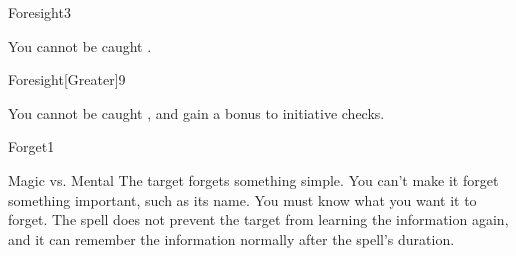 \begin{spellsection}{Foresight}{3}
    \begin{spellheader}
    \end{spellheader}
    \begin{spellcontent}
        \begin{spelleffects}
            \spelleffect You cannot be caught \unaware.
            \spelldur \durlong
        \end{spelleffects}
    \end{spellcontent}
    \begin{spellfooter}
        \miscastexplode
    \end{spellfooter}
\end{spellsection}

\begin{spellsection}{Foresight}[Greater]{9}
    \begin{spellheader}
    \end{spellheader}
    \begin{spellcontent}
        \begin{spelleffects}
            \spelleffect You cannot be caught \unaware, and gain a  bonus to initiative checks.
            \spelldur \durlong
        \end{spelleffects}
    \end{spellcontent}
    \begin{spellfooter}
        \miscastexplode
    \end{spellfooter}
\end{spellsection}

\begin{spellsection}{Forget}{1}
    \begin{spellheader}
    \end{spellheader}
    \begin{spellcontent}
        \begin{spelltargetinginfo}
        \end{spelltargetinginfo}
        \begin{spelleffects}
            \begin{spellattack}{Magic vs. Mental}
                \spelleffect The target forgets something simple. You can't make it forget something important, such as its name. You must know what you want it to forget. The spell does not prevent the target from learning the information again, and it can remember the information normally after the spell's duration.
            \end{spellattack}
            \spelldur \durlong
        \end{spelleffects}
    \end{spellcontent}
    \begin{spellfooter}
        \miscastrandom
    \end{spellfooter}
\end{spellsection}

